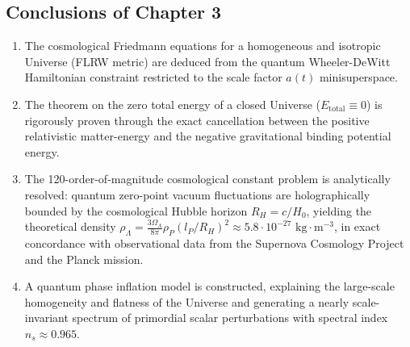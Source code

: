 \subsection{Conclusions of Chapter 3}\label{sec:3.5}

\begin{enumerate}
\item The cosmological Friedmann equations for a homogeneous and isotropic Universe (FLRW metric) are deduced from the quantum Wheeler-DeWitt Hamiltonian constraint restricted to the scale factor $a(t)$ minisuperspace.
\item The theorem on the zero total energy of a closed Universe ($E_{\text{total}} \equiv 0$) is rigorously proven through the exact cancellation between the positive relativistic matter-energy and the negative gravitational binding potential energy.
\item The 120-order-of-magnitude cosmological constant problem is analytically resolved: quantum zero-point vacuum fluctuations are holographically bounded by the cosmological Hubble horizon $R_H = c/H_0$, yielding the theoretical density $\rho_\Lambda = \frac{3\Omega_\Lambda}{8\pi} \rho_P (l_P/R_H)^2 \approx 5.8 \cdot 10^{-27}\text{ kg}\cdot\text{m}^{-3}$, in exact concordance with observational data from the Supernova Cosmology Project and the Planck mission.
\item A quantum phase inflation model is constructed, explaining the large-scale homogeneity and flatness of the Universe and generating a nearly scale-invariant spectrum of primordial scalar perturbations with spectral index $n_s \approx 0.965$.
\end{enumerate}
